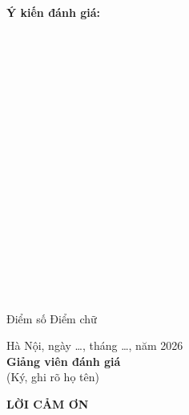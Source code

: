 \documentclass[12pt,a4paper]{article}
\begin{document}
\newpage
\begin{center}
    \textbf{Ý kiến đánh giá:}
\end{center}

\vspace{0.2cm}

\noindent\makebox[\linewidth]{\dotfill}\\[0.2cm]
\noindent\makebox[\linewidth]{\dotfill}\\[0.2cm]
\noindent\makebox[\linewidth]{\dotfill}\\[0.2cm]
\noindent\makebox[\linewidth]{\dotfill}\\[0.2cm]
\noindent\makebox[\linewidth]{\dotfill}\\[0.2cm]
\noindent\makebox[\linewidth]{\dotfill}\\[0.2cm]
\noindent\makebox[\linewidth]{\dotfill}\\[0.2cm]
\noindent\makebox[\linewidth]{\dotfill}\\[0.2cm]
\noindent\makebox[\linewidth]{\dotfill}\\[0.2cm]
\noindent\makebox[\linewidth]{\dotfill}\\[0.2cm]
\noindent\makebox[\linewidth]{\dotfill}\\[0.2cm]
\noindent\makebox[\linewidth]{\dotfill}\\[0.2cm]
\noindent\makebox[\linewidth]{\dotfill}\\[0.2cm]
\noindent\makebox[\linewidth]{\dotfill}\\[0.2cm]
\noindent\makebox[\linewidth]{\dotfill}\\[0.2cm]
\noindent\makebox[\linewidth]{\dotfill}\\[0.2cm]
\noindent\makebox[\linewidth]{\dotfill}\\[0.2cm]
\noindent\makebox[\linewidth]{\dotfill}

\noindent\hspace{3cm} Điểm số \dotfill{} Điểm chữ \dotfill

\vspace{1.5cm}

\begin{center}
    Hà Nội, ngày \ldots, tháng \ldots, năm 2026\\[0.2cm]
    \textbf{Giảng viên đánh giá}\\[0.1cm]
    (Ký, ghi rõ họ tên)
\end{center}


\newpage

\begin{center}
    \textbf{\large LỜI CẢM ƠN}
\end{center}
\end{document}

